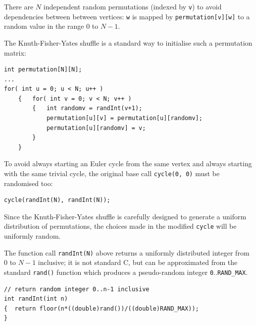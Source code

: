 \documentclass[preprint,times]{elsarticle}
\begin{document}
There are $N$ independent random permutations (indexed by \texttt{v}) to avoid dependencies between between vertices: \texttt{w} is mapped by \texttt{permutation[v][w]} to a random value in the range $0$ to $N-1$.


The Knuth-Fisher-Yates shuffle \cite[p145--146]{knuth2} is a standard way to initialise such a permutation matrix:\label{shuffle}

\begin{Verbatim}
int permutation[N][N];
...
for( int u = 0; u < N; u++ )
    {   for( int v = 0; v < N; v++ )
        {   int randomv = randInt(v+1);
            permutation[u][v] = permutation[u][randomv];
            permutation[u][randomv] = v;
        }
    }
\end{Verbatim}

To avoid always starting an Euler cycle from the same vertex and always starting with the same trivial cycle, the original base call \texttt{cycle(0, 0)} must be randomised too:

\begin{Verbatim}
cycle(randInt(N), randInt(N)); 
\end{Verbatim}

Since the Knuth-Fisher-Yates shuffle is carefully designed to generate a uniform distribution of permutations, the choices made in the modified \texttt{cycle} will be uniformly random. %

The function call \texttt{randInt(N)} above returns a uniformly distributed integer from $0$ to $N-1$ inclusive; it is not standard C, but can be approximated from the standard \texttt{rand()} function which produces a pseudo-random integer \texttt{0}..\texttt{RAND\_MAX}. 

\begin{Verbatim}
// return random integer 0..n-1 inclusive
int randInt(int n) 
{  return floor(n*((double)rand())/((double)RAND_MAX));
}
\end{Verbatim}
\end{document}

